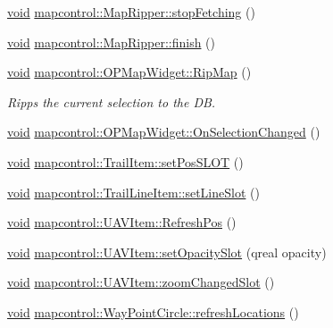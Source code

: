 \begin{DoxyCompactItemize}
\item 
\hyperlink{group___u_a_v_objects_plugin_ga444cf2ff3f0ecbe028adce838d373f5c}{void} \hyperlink{group___o_p_map_widget_ga0419a5b1b5c4fef8c6344c8a29320cb7}{mapcontrol\-::\-Map\-Ripper\-::stop\-Fetching} ()
\item 
\hyperlink{group___u_a_v_objects_plugin_ga444cf2ff3f0ecbe028adce838d373f5c}{void} \hyperlink{group___o_p_map_widget_ga137eaecaa016ae12f23b3638657fe797}{mapcontrol\-::\-Map\-Ripper\-::finish} ()
\item 
\hyperlink{group___u_a_v_objects_plugin_ga444cf2ff3f0ecbe028adce838d373f5c}{void} \hyperlink{group___o_p_map_widget_ga3cc1af46a4555caac4d2bcafc775dd3c}{mapcontrol\-::\-O\-P\-Map\-Widget\-::\-Rip\-Map} ()
\begin{DoxyCompactList}\small\item\em \-Ripps the current selection to the \-D\-B. \end{DoxyCompactList}\item 
\hyperlink{group___u_a_v_objects_plugin_ga444cf2ff3f0ecbe028adce838d373f5c}{void} \hyperlink{group___o_p_map_widget_gaebc469fcc05092fd93d332b528eae3e5}{mapcontrol\-::\-O\-P\-Map\-Widget\-::\-On\-Selection\-Changed} ()
\item 
\hyperlink{group___u_a_v_objects_plugin_ga444cf2ff3f0ecbe028adce838d373f5c}{void} \hyperlink{group___o_p_map_widget_ga777b7b40dc91ba179a19cc547adeecab}{mapcontrol\-::\-Trail\-Item\-::set\-Pos\-S\-L\-O\-T} ()
\item 
\hyperlink{group___u_a_v_objects_plugin_ga444cf2ff3f0ecbe028adce838d373f5c}{void} \hyperlink{group___o_p_map_widget_gaca380937db6013081d160fdcfed13e2f}{mapcontrol\-::\-Trail\-Line\-Item\-::set\-Line\-Slot} ()
\item 
\hyperlink{group___u_a_v_objects_plugin_ga444cf2ff3f0ecbe028adce838d373f5c}{void} \hyperlink{group___o_p_map_widget_gaf033b133e7911ff98ebc1b6977818fc8}{mapcontrol\-::\-U\-A\-V\-Item\-::\-Refresh\-Pos} ()
\item 
\hyperlink{group___u_a_v_objects_plugin_ga444cf2ff3f0ecbe028adce838d373f5c}{void} \hyperlink{group___o_p_map_widget_ga3b9172d484d3efba36eeae6bddb3f8f2}{mapcontrol\-::\-U\-A\-V\-Item\-::set\-Opacity\-Slot} (qreal opacity)
\item 
\hyperlink{group___u_a_v_objects_plugin_ga444cf2ff3f0ecbe028adce838d373f5c}{void} \hyperlink{group___o_p_map_widget_ga53c572c774d383eb6b672d3ef1da6424}{mapcontrol\-::\-U\-A\-V\-Item\-::zoom\-Changed\-Slot} ()
\item 
\hyperlink{group___u_a_v_objects_plugin_ga444cf2ff3f0ecbe028adce838d373f5c}{void} \hyperlink{group___o_p_map_widget_ga56684f440455598d530b5952c5b0d640}{mapcontrol\-::\-Way\-Point\-Circle\-::refresh\-Locations} ()

\end{DoxyCompactItemize}
